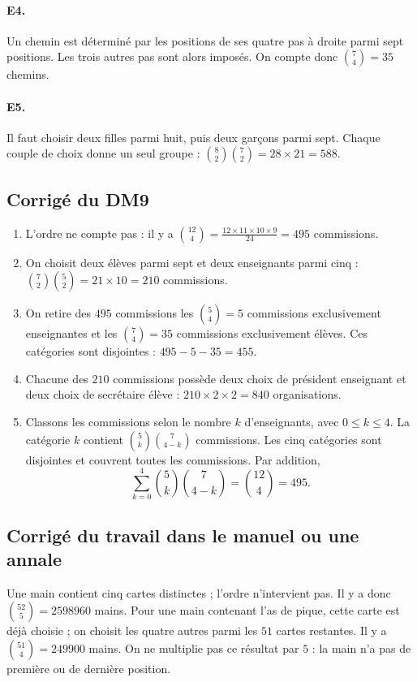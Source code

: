 \paragraph{E4.}Un chemin est déterminé par les positions de ses quatre pas à droite parmi sept positions. Les trois autres pas sont alors imposés. On compte donc $\binom74=35$ chemins.

\paragraph{E5.}Il faut choisir deux filles parmi huit, puis deux garçons parmi sept. Chaque couple de choix donne un seul groupe : $\binom82\binom72=28\times21=588$.


\subsection{Corrigé du DM9}\begin{enumerate}
\item L'ordre ne compte pas : il y a $\binom{12}{4}=\frac{12\times11\times10\times9}{24}=495$ commissions.
\item On choisit deux élèves parmi sept et deux enseignants parmi cinq : $\binom72\binom52=21\times10=210$ commissions.
\item On retire des $495$ commissions les $\binom54=5$ commissions exclusivement enseignantes et les $\binom74=35$ commissions exclusivement élèves. Ces catégories sont disjointes : $495-5-35=455$.
\item Chacune des $210$ commissions possède deux choix de président enseignant et deux choix de secrétaire élève : $210\times2\times2=840$ organisations.
\item Classons les commissions selon le nombre $k$ d'enseignants, avec $0\le k\le4$. La catégorie $k$ contient $\binom5k\binom7{4-k}$ commissions. Les cinq catégories sont disjointes et couvrent toutes les commissions. Par addition,
\[\sum_{k=0}^4\binom5k\binom7{4-k}=\binom{12}4=495.\]
\end{enumerate}

\subsection{Corrigé du travail dans le manuel ou une annale}Une main contient cinq cartes distinctes ; l'ordre n'intervient pas. Il y a donc $\binom{52}5=\num{2598960}$ mains. Pour une main contenant l'as de pique, cette carte est déjà choisie ; on choisit les quatre autres parmi les $51$ cartes restantes. Il y a $\binom{51}4=\num{249900}$ mains. On ne multiplie pas ce résultat par $5$ : la main n'a pas de première ou de dernière position.

\fi

